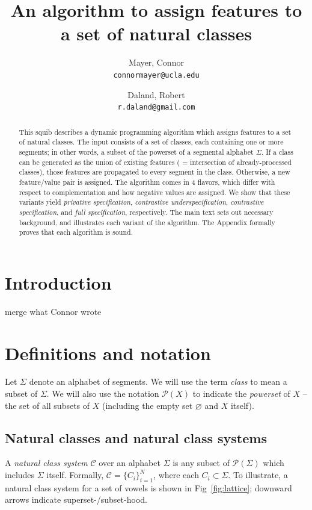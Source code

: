\documentclass[11pt, oneside]{article}   	%
\title{An algorithm to assign features to a set of natural classes}
\author{}
\author{
  Mayer, Connor \\
  \texttt{connormayer@ucla.edu}
  \and
  Daland, Robert \\
  \texttt{r.daland@gmail.com}
}
\begin{document}
\maketitle

\begin{abstract}
This squib describes a dynamic programming algorithm which assigns features to a set of natural classes. The input consists of a set of classes, each containing one or more segments; in other words, a subset of the powerset of a segmental alphabet $\Sigma$. If a class can be generated as the union of existing features ( = intersection of already-processed classes), those features are propagated to every segment in the class. Otherwise, a new feature/value pair is assigned. The algorithm comes in 4 flavors, which differ with respect to complementation and how negative values are assigned. We show that these variants yield \textit{privative specification}, \textit{contrastive underspecification}, \textit{contrastive specification}, and \textit{full specification}, respectively. The main text sets out necessary background, and illustrates each variant of the algorithm. The Appendix formally proves that each algorithm is sound.
\end{abstract}

\section{Introduction}
merge what Connor wrote

\section{Definitions and notation}

Let $\Sigma$ denote an alphabet of segments. We will use the term \textit{class} to mean a subset of $\Sigma$. We will also use the notation $\mathcal P(X)$ to indicate the \textit{powerset} of $X$ -- the set of all subsets of $X$ (including the empty set $\varnothing$ and $X$ itself).

\subsection{Natural classes and natural class systems}

A \textit{natural class system} $\mathcal C$ over an alphabet $\Sigma$ is any subset of $\mathcal P(\Sigma)$ which includes $\Sigma$ itself. Formally, $\mathcal C = \{ C_i \}_{i=1}^N$, where each $C_i \subset \Sigma$. To illustrate, a natural class system for a set of vowels is shown in Fig~\ref{fig:lattice}; downward arrows indicate superset-/subset-hood.
\end{document}
